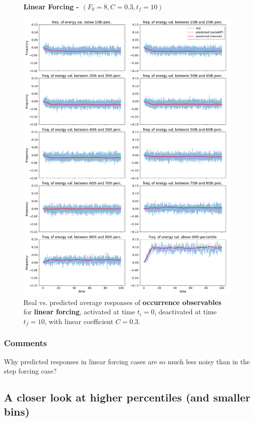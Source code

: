 \documentclass{article}
\begin{document}
\begin{figure}[!h]
	\centering
	\textbf{Linear Forcing - $(F_0=8, C=0.3, t_f=10)$}\par\medskip
	\includegraphics[width=0.9\linewidth]{fig/pred_bin_L_03_10.png}
	\caption{Real vs. predicted average responses of \textbf{occurrence observables} for \textbf{linear forcing}, activated at time $t_i=0$, deactivated at time $t_f=10$, with linear coefficient $C=0.3$.}
	\label{fig:pred_bin_L_03_10}
\end{figure}

\subsubsection{Comments}

Why predicted responses in linear forcing cases are so much less noisy than in the step forcing case?

\subsection{A closer look at higher percentiles (and smaller bins)}
\end{document}
